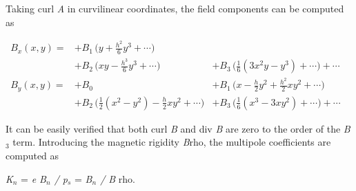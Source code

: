 Taking curl \textit{A} in curvilinear coordinates, the field components can be computed as 

\[
\begin{aligned}
B_x(x,y) =
&+ B_1\,\Big(y+\frac{h^2}{6}y^3+\cdots\Big)&  &  \\
&+ B_2\,\Big(xy - \frac{h^3}{6}y^3+\cdots \Big)&+B_3\,\Big(\frac{1}{6}(3x^2y-y^3)+ \cdots \Big)+\cdots\\
B_y(x,y)=
&+ B_0 & + B_1\,\Big(x-\frac{h}{2}y^2+\frac{h^2}{2}xy^2+\cdots \Big)\\
&+ B_2\,\Big(\frac{1}{2}(x^2-y^2)-\frac{h}{2}xy^2+\cdots \Big) & + B_3\,\Big(\frac{1}{6}(x^3-3xy^2)+ \cdots \Big)+\cdots
\end{aligned}
\]

It can be easily verified that both curl \textit{B} and div \textit{B}
are zero to the order of the \textit{B}$_3$ term. Introducing the
magnetic rigidity \textit{B}rho, the multipole coefficients are computed
as  

\textit{K$_n$} = \textit{e B$_n$ / p$_s$} =  \textit{B$_n$ / B} rho. 



